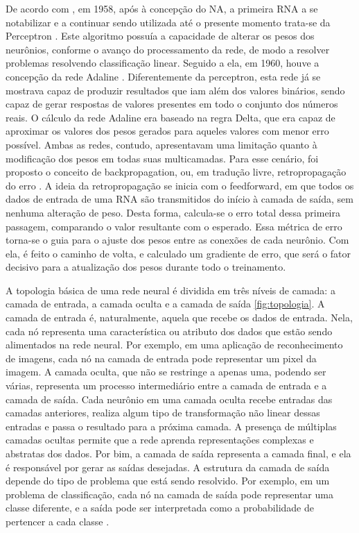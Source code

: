 De acordo com  \cite{rauber2005redes}, em 1958, após à concepção do NA, a primeira RNA a se notabilizar e a continuar sendo utilizada até o presente momento trata-se da Perceptron \cite{rosenblatt1958perceptron}. Este algoritmo possuía a capacidade de alterar os pesos dos neurônios, conforme o avanço do processamento da rede, de modo a resolver problemas resolvendo classificação linear. Seguido a ela, em 1960, houve a concepção da rede Adaline \cite{widrow1960adaptive}. Diferentemente da perceptron, esta rede já se mostrava capaz de produzir resultados que iam além dos valores binários, sendo capaz de gerar respostas de valores presentes em todo o conjunto dos números reais. O cálculo da rede Adaline era baseado na regra Delta, que era capaz de aproximar os valores dos pesos gerados para aqueles valores com menor erro possível. Ambas as redes, contudo, apresentavam uma limitação quanto à modificação dos pesos em todas suas multicamadas. Para esse cenário, foi proposto o conceito de backpropagation, ou, em tradução livre, retropropagação do erro \cite{rumelhart1986learning}. A ideia da retropropagação se inicia com o feedforward, em que todos os dados de entrada de uma RNA são transmitidos do início à camada de saída, sem nenhuma alteração de peso. Desta forma, calcula-se o erro total dessa primeira passagem, comparando o valor resultante com o esperado. Essa métrica de erro torna-se o guia para o ajuste dos pesos entre as conexões de cada neurônio. Com ela, é feito o caminho de volta, e calculado um gradiente de erro, que será o fator decisivo para a atualização dos pesos durante todo o treinamento.

A topologia básica de uma rede neural é dividida em três níveis de camada: a camada de entrada, a camada oculta e a camada de saída \ref{fig:topologia}. A camada de entrada é, naturalmente, aquela que recebe os dados de entrada. Nela, cada nó representa uma característica ou atributo dos dados que estão sendo alimentados na rede neural. Por exemplo, em uma aplicação de reconhecimento de imagens, cada nó na camada de entrada pode representar um pixel da imagem. A camada oculta, que não se restringe a apenas uma, podendo ser várias, representa um processo intermediário entre a camada de entrada e a camada de saída. Cada neurônio em uma camada oculta recebe entradas das camadas anteriores, realiza algum tipo de transformação não linear dessas entradas e passa o resultado para a próxima camada. A presença de múltiplas camadas ocultas permite que a rede aprenda representações complexas e abstratas dos dados. Por bim, a camada de saída representa a camada final, e ela é responsável por gerar as saídas desejadas. A estrutura da camada de saída depende do tipo de problema que está sendo resolvido. Por exemplo, em um problema de classificação, cada nó na camada de saída pode representar uma classe diferente, e a saída pode ser interpretada como a probabilidade de pertencer a cada classe \cite{rauber2005redes}.

